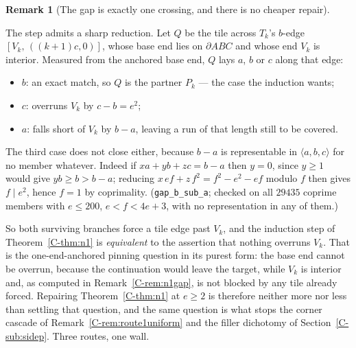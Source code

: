 \documentclass[11pt,reqno]{amsart}
\theoremstyle{plain}
\theoremstyle{definition}
\newtheorem{remark}[theorem]{Remark}
\begin{document}
\begin{remark}[The gap is exactly one crossing, and there is no cheaper repair]\label{O-n1gapexact}

The step admits a sharp reduction. Let $Q$ be the tile across $T_k$'s $b$-edge
$[V_k,\,((k+1)c,0)]$, whose base end lies on $\partial ABC$ and whose end $V_k$ is interior. Measured
from the anchored base end, $Q$ lays $a$, $b$ or $c$ along that edge:
\begin{itemize}
\item $b$: an exact match, so $Q$ is the partner $P_k$ --- the case the induction wants;
\item $c$: overruns $V_k$ by $c-b=e^2$;
\item $a$: falls short of $V_k$ by $b-a$, leaving a run of that length still to be covered.
\end{itemize}
The third case does not close either, because $b-a$ is representable in $\langle a,b,c\rangle$ for no
member whatever. Indeed if $xa+yb+zc=b-a$ then $y=0$, since $y\ge1$ would give $yb\ge b>b-a$;
reducing $x\,ef+z\,f^2=f^2-e^2-ef$ modulo $f$ then gives $f\mid e^2$, hence $f=1$ by coprimality.
(\texttt{gap\_b\_sub\_a}; checked on all $29435$ coprime members with $e\le200$, $e<f<4e+3$, with no
representation in any of them.)

So both surviving branches force a tile edge past $V_k$, and the induction step of
Theorem~\ref{C-thm:n1} is \emph{equivalent} to the assertion that nothing overruns $V_k$. That is the
one-end-anchored pinning question in its purest form: the base end cannot be overrun, because the
continuation would leave the target, while $V_k$ is interior and, as computed in
Remark~\ref{C-rem:n1gap}, is not blocked by any tile already forced. Repairing Theorem~\ref{C-thm:n1} at
$e\ge2$ is therefore neither more nor less than settling that question, and the same question is what
stops the corner cascade of Remark~\ref{C-rem:route1uniform} and the filler dichotomy of
Section~\ref{C-sub:sidep}. Three routes, one wall.
\end{remark}
\end{document}
